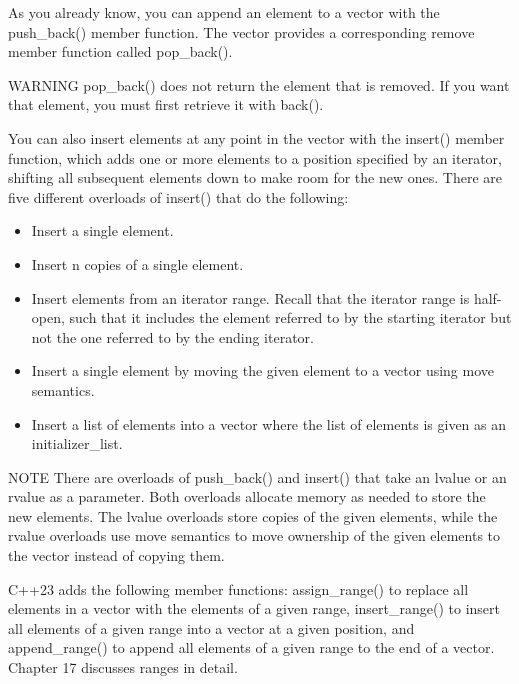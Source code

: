 
As you already know, you can append an element to a vector with the push\_back() member function. The vector provides a corresponding remove member function called pop\_back().

\begin{myWarning}{WARNING}
pop\_back() does not return the element that is removed. If you want that element, you must first retrieve it with back().
\end{myWarning}

You can also insert elements at any point in the vector with the insert() member function, which adds one or more elements to a position specified by an iterator, shifting all subsequent elements down to make room for the new ones. There are five different overloads of insert() that do the following:

\begin{itemize}
\item
Insert a single element.

\item
Insert n copies of a single element.

\item
Insert elements from an iterator range. Recall that the iterator range is half-open, such that it includes the element referred to by the starting iterator but not the one referred to by the ending iterator.

\item
Insert a single element by moving the given element to a vector using move semantics.

\item
Insert a list of elements into a vector where the list of elements is given as an initializer\_list.
\end{itemize}

\begin{myNotic}{NOTE}
There are overloads of push\_back() and insert() that take an lvalue or an rvalue as a parameter. Both overloads allocate memory as needed to store the new elements. The lvalue overloads store copies of the given elements, while the rvalue overloads use move semantics to move ownership of the given elements to the vector instead of copying them.
\end{myNotic}


C++23 adds the following member functions: assign\_range() to replace all elements in a vector with the elements of a given range, insert\_range() to insert all elements of a given range into a vector at a given position, and append\_range() to append all elements of a given range to the end of a vector. Chapter 17 discusses ranges in detail.

